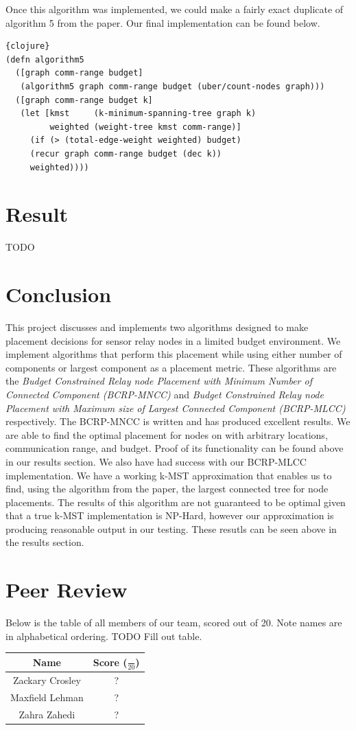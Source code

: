 \documentclass{article}
\begin{document}
Once this algorithm was implemented, we could make a fairly exact duplicate of algorithm 5 from the paper.
Our final implementation can be found below.


\begin{lstlisting}{clojure}
(defn algorithm5
  ([graph comm-range budget]
   (algorithm5 graph comm-range budget (uber/count-nodes graph)))
  ([graph comm-range budget k]
   (let [kmst     (k-minimum-spanning-tree graph k)
         weighted (weight-tree kmst comm-range)]
     (if (> (total-edge-weight weighted) budget)
     (recur graph comm-range budget (dec k))
     weighted))))
\end{lstlisting}

\section{Result}
TODO

\section{Conclusion}
This project discusses and implements two algorithms designed to make placement decisions for sensor relay nodes in a limited budget environment.
We implement algorithms that perform this placement while using either number of components or largest component as a placement metric.
These algorithms are the \textit{Budget Constrained Relay node Placement with Minimum Number of Connected Component (BCRP-MNCC)} and \textit{Budget Constrained Relay node Placement with Maximum size of Largest Connected Component (BCRP-MLCC)} respectively.
The BCRP-MNCC is written and has produced excellent results.
We are able to find the optimal placement for nodes on with arbitrary locations, communication range, and budget.
Proof of its functionality can be found above in our results section.
We also have had success with our BCRP-MLCC implementation.
We have a working k-MST approximation that enables us to find, using the algorithm from the paper, the largest connected tree for node placements.
The results of this algorithm are not guaranteed to be optimal given that a true k-MST implementation is NP-Hard, however our approximation is producing reasonable output in our testing.
These resutls can be seen above in the results section.

\section{Peer Review}
Below is the table of all members of our team, scored out of 20.
Note names are in alphabetical ordering.
TODO Fill out table.
\begin{center}
  \begin{tabular}{|c|c|}
     \hline
  Name & Score ($\frac{}{20}$)\\
   \hline
  Zackary Crosley & ? \\
   \hline
  Maxfield Lehman & ?\\
   \hline
  Zahra Zahedi & ?\\
                  \hline
\end{tabular}
\end{center}
\end{document}
